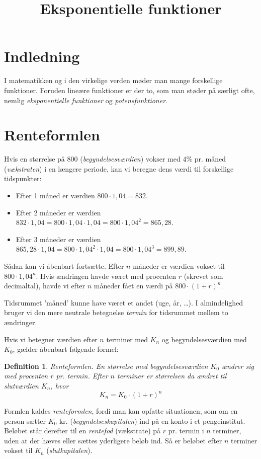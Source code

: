 \documentclass[12pt,oneside,a4paper]{article}
\title{Eksponentielle funktioner}
\newtheorem{mydef}[thm]{Definition}
\begin{document}

\section{Indledning}
I matematikken og i den virkelige verden møder man mange forskellige funktioner.
Foruden lineære funktioner er der to, som man støder på særligt ofte, nemlig
{\em eksponentielle funktioner} og {\em potensfunktioner}.

\section{Renteformlen}
Hvis en størrelse på 800 ({\em begyndelsesværdien}) vokser med $4\%$ pr. måned
({\em vækst\-raten}) i en længere periode, kan vi beregne dens værdi til
forskellige tidspunkter:
\begin{itemize}
    \item Efter 1 måned er værdien $800\cdot 1,04 = 832$.
    \item Efter 2 måneder er værdien $832\cdot 1,04 = 800 \cdot 1,04 \cdot 1,04
        = 800 \cdot 1,04^2 = 865,28$.
    \item Efter 3 måneder er værdien $865,28\cdot 1,04 = 800 \cdot 1,04^2 \cdot
        1,04 = 800 \cdot 1,04^3 = 899,89$.
\end{itemize}
Sådan kan vi åbenbart fortsætte. Efter $n$ måneder er værdien vokset til
$800\cdot 1,04^n$. Hvis ændringen havde været med procenten $r$ (skrevet som
decimaltal), havde vi efter $n$ måneder fået en værdi på $800\cdot(1+r)^n$.

Tidsrummet 'måned' kunne have været et andet (uge, år, \ldots). I almindelighed
bruger vi den mere neutrale betegnelse {\em termin} for tidsrummet mellem to
ændringer.

Hvis vi betegner værdien efter $n$ terminer med $K_n$ og begyndelsesværdien med
$K_0$, gælder åbenbart følgende formel:
\begin{mydef}
    {\em Renteformlen}. En størrelse med begyndelsesværdien $K_0$ ændrer sig
    med procenten $r$ pr. termin. Efter $n$ terminer er størrelsen da ændret
    til slutværdien $K_n$, hvor
    $$
    K_n = K_0 \cdot (1+r)^n
    $$
\end{mydef}
Formlen kaldes {\em renteformlen}, fordi man kan opfatte situationen, som om en
person sætter $K_0$ kr. ({\em begyndelseskapitalen}) ind på en konto i et
penge\-institut. Beløbet står derefter til en {\em rentefod} (vækstrate) på $r$
pr. termin i $n$ terminer, uden at der hæves eller sættes yderligere beløb ind.
Så er beløbet efter $n$ terminer vokset til $K_n$ ({\em slutkapitalen}).
\end{document}
